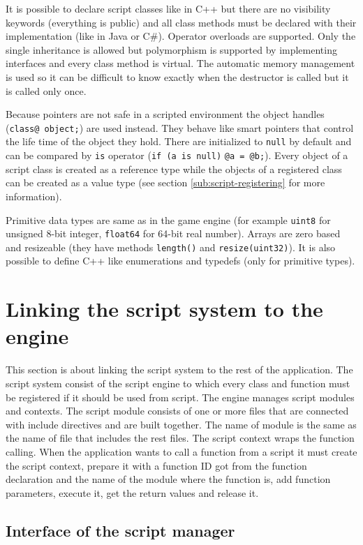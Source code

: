It is possible to declare script classes like in C++ but there are no visibility keywords (everything is public) and all class methods must be declared with their implementation (like in Java or C\#). Operator overloads are supported. Only the single inheritance is allowed but polymorphism is supported by implementing interfaces and every class method is virtual. The automatic memory management is used so it can be difficult to know exactly when the destructor is called but it is called only once.

Because pointers are not safe in a scripted environment the object handles (\verb/class@ object;/) are used instead. They behave like smart pointers that control the life time of the object they hold. There are initialized to \verb/null/ by default and can be compared by \verb/is/ operator (\verb/if (a is null)/ \verb/@a = @b;/). Every object of a script class is created as a reference type while the objects of a registered class can be created as a value type (see section \ref{sub:script-registering} for more information).

Primitive data types are same as in the game engine (for example \verb/uint8/ for unsigned 8-bit integer, \verb/float64/ for 64-bit real number). Arrays are zero based and resizeable (they have methods \verb/length()/ and \verb/resize(uint32)/). It is also possible to define C++ like enumerations and typedefs (only for primitive types).

\section{Linking the script system to the engine}

This section is about linking the script system to the rest of the application. The script system consist of the script engine to which every class and function must be registered if it should be used from script. The engine manages script modules and contexts. The script module consists of one or more files that are connected with include directives and are built together. The name of module is the same as the name of file that includes the rest files. The script context wraps the function calling. When the application wants to call a function from a script it must create the script context, prepare it with a function ID got from the function declaration and the name of the module where the function is, add function parameters, execute it, get the return values and release it.

\subsection{Interface of the script manager}

